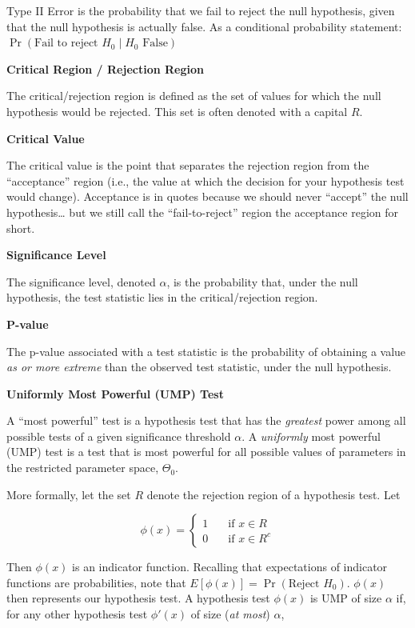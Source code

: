 \documentclass[
  letterpaper,
  DIV=11,
  numbers=noendperiod]{scrreprt}
\begin{document}
Type II Error is the probability that we fail to reject the null
hypothesis, given that the null hypothesis is actually false. As a
conditional probability statement:
\(\Pr(\text{Fail to reject }H_0 \mid H_0 \text{ False})\)

\textbf{Critical Region / Rejection Region}

The critical/rejection region is defined as the set of values for which
the null hypothesis would be rejected. This set is often denoted with a
capital \(R\).

\textbf{Critical Value}

The critical value is the point that separates the rejection region from
the ``acceptance'' region (i.e., the value at which the decision for
your hypothesis test would change). Acceptance is in quotes because we
should never ``accept'' the null hypothesis\ldots{} but we still call
the ``fail-to-reject'' region the acceptance region for short.

\textbf{Significance Level}

The significance level, denoted \(\alpha\), is the probability that,
under the null hypothesis, the test statistic lies in the
critical/rejection region.

\textbf{P-value}

The p-value associated with a test statistic is the probability of
obtaining a value \emph{as or more extreme} than the observed test
statistic, under the null hypothesis.

\textbf{Uniformly Most Powerful (UMP) Test}

A ``most powerful'' test is a hypothesis test that has the
\emph{greatest} power among all possible tests of a given significance
threshold \(\alpha\). A \emph{uniformly} most powerful (UMP) test is a
test that is most powerful for all possible values of parameters in the
restricted parameter space, \(\Theta_0\).

More formally, let the set \(R\) denote the rejection region of a
hypothesis test. Let

\[
\phi(x) = \begin{cases} 1 & \quad \text{if } x \in R \\ 0 & \quad \text{if } x \in R^c \end{cases}
\]

Then \(\phi(x)\) is an indicator function. Recalling that expectations
of indicator functions are probabilities, note that
\(E[\phi(x)] = \Pr(\text{Reject } H_0)\). \(\phi(x)\) then represents
our hypothesis test. A hypothesis test \(\phi(x)\) is UMP of size
\(\alpha\) if, for any other hypothesis test \(\phi'(x)\) of size
(\emph{at most}) \(\alpha\),
\end{document}
